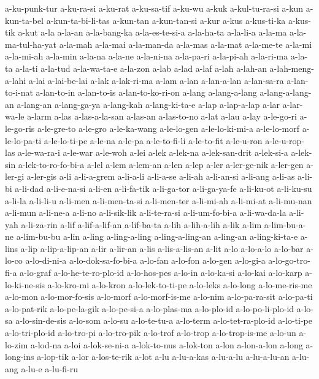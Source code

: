 {a-ku-punk-tur a-ku-ra-si a-ku-rat a-ku-sa-tif a-ku-wu a-kuk a-kul-tu-ra-si
a-kun a-kun-ta-bel a-kun-ta-bi-li-tas a-kun-tan a-kun-tan-si a-kur a-kus
a-kus-ti-ka a-kus-tik a-kut a-la a-la-an a-la-bang-ka a-la-es-te-si-a
a-la-ha-ta a-la-li-a a-la-ma a-la-ma-tul-ha-yat a-la-mah a-la-mai
a-la-man-da a-la-mas a-la-mat a-la-me-te a-la-mi a-la-mi-ah a-la-min
a-la-na a-la-ne a-la-ni-na a-la-pa-ri a-la-pi-ah a-la-ri-ma a-la-ta
a-la-ti a-la-tud a-la-wa-ta-e a-la-zon a-lab a-lad a-laf a-lah a-lah-an
a-lah-meng-a-lahi a-lai a-lai-be-lai a-lak a-lak-ri-ma a-lam a-lan
a-lan-a-lan a-lan-sa-ra a-lan-to-i-nat a-lan-to-in a-lan-to-is
a-lan-to-ko-ri-on a-lang a-lang-a-lang a-lang-a-lang-an a-lang-an
a-lang-ga-ya a-lang-kah a-lang-ki-ta-e a-lap a-lap-a-lap a-lar a-lar-wa-le
a-larm a-las a-las-a-la-san a-las-an a-las-to-no a-lat a-lau a-lay
a-le-go-ri a-le-go-ris a-le-gre-to a-le-gro a-le-ka-wang a-le-lo-gen
a-le-lo-ki-mi-a a-le-lo-morf a-le-lo-pa-ti a-le-lo-ti-pe a-le-na a-le-pa
a-le-to-fi-li a-le-to-fit a-le-u-ron a-le-u-rop-las a-le-wa-ra-i a-le-war
a-le-woh a-lei a-lek a-lek-na a-lek-san-drit a-lek-si-a a-lek-sin
a-lek-to-ro-fo-bi-a a-lel a-lem a-lem-an a-len a-lep a-ler a-ler-ge-nik
a-ler-gen a-ler-gi a-ler-gis a-li a-li-a-grem a-li-a-li a-li-a-se a-li-ah
a-li-an-si a-li-ang a-li-as a-li-bi a-li-dad a-li-e-na-si a-li-en
a-li-fa-tik a-li-ga-tor a-li-ga-ya-fe a-li-ku-ot a-li-ku-su a-li-la
a-li-li-u a-li-men a-li-men-ta-si a-li-men-ter a-li-mi-ah a-li-mi-at
a-li-mu-nan a-li-mun a-li-ne-a a-li-no a-li-sik-lik a-li-te-ra-si
a-li-um-fo-bi-a a-li-wa-da-la a-li-yah a-li-za-rin a-lif a-lif-a-lif-an
a-lif-ba-ta a-lih a-lih-a-lih a-lik a-lim a-lim-bu-a-ne a-lim-bu-bu a-lin
a-ling a-ling-a-ling a-ling-a-ling-an a-ling-an a-ling-ki-ta-e a-lins
a-lip a-lip-a-lip-an a-lir a-lir-an a-lis a-lis-a-lis-an a-lit a-lo
a-lo-a-lo a-lo-bar a-lo-co a-lo-di-ni-a a-lo-dok-sa-fo-bi-a a-lo-fan
a-lo-fon a-lo-gen a-lo-gi-a a-lo-go-tro-fi-a a-lo-graf
a-lo-he-te-ro-plo-id a-lo-hos-pes a-lo-in a-lo-ka-si a-lo-kai a-lo-karp
a-lo-ki-ne-sis a-lo-kro-mi a-lo-kron a-lo-lek-to-ti-pe a-lo-leks a-lo-long
a-lo-me-ris-me a-lo-mon a-lo-mor-fo-sis a-lo-morf a-lo-morf-is-me a-lo-nim
a-lo-pa-ra-sit a-lo-pa-ti a-lo-pat-rik a-lo-pe-la-gik a-lo-pe-si-a
a-lo-plas-ma a-lo-plo-id a-lo-po-li-plo-id a-lo-sa a-lo-sin-de-sis
a-lo-som a-lo-su a-lo-te-tu-a a-lo-term a-lo-tet-ra-plo-id a-lo-ti-pe
a-lo-tri-plo-id a-lo-tro-pi a-lo-tro-pik a-lo-trof a-lo-trop
a-lo-trop-is-me a-lo-un a-lo-zim a-lod-na a-loi a-lok-se-ni-a a-lok-to-nus
a-lok-ton a-lon a-lon-a-lon a-long a-long-ins a-lop-tik a-lor a-los-te-rik
a-lot a-lu a-lu-a-kas a-lu-a-lu a-lu-a-lu-an a-lu-ang a-lu-e a-lu-fi-ru
}
